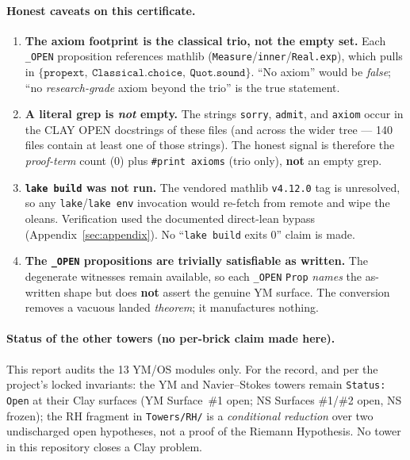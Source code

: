 \documentclass[11pt]{article}
\begin{document}
\paragraph{Honest caveats on this certificate.}
\begin{enumerate}
  \item \textbf{The axiom footprint is the classical trio, not the empty set.}
        Each \texttt{\_OPEN} proposition references mathlib
        (\texttt{Measure}/\texttt{inner}/\texttt{Real.exp}), which pulls in
        $\{\texttt{propext},\ \texttt{Classical.choice},\ \texttt{Quot.sound}\}$.
        ``No axiom'' would be \emph{false}; ``no \emph{research-grade} axiom
        beyond the trio'' is the true statement.
  \item \textbf{A literal grep is \emph{not} empty.} The strings
        \texttt{sorry}, \texttt{admit}, and \texttt{axiom} occur in the CLAY
        OPEN docstrings of these files (and across the wider tree --- 140 files
        contain at least one of those strings). The honest signal is therefore
        the \emph{proof-term} count (0) plus \texttt{\#print axioms} (trio only),
        \textbf{not} an empty grep.
  \item \textbf{\texttt{lake build} was not run.} The vendored mathlib
        \texttt{v4.12.0} tag is unresolved, so any \texttt{lake}/\texttt{lake env}
        invocation would re-fetch from remote and wipe the oleans. Verification
        used the documented direct-lean bypass (Appendix~\ref{sec:appendix}). No
        ``\texttt{lake build} exits 0'' claim is made.
  \item \textbf{The \texttt{\_OPEN} propositions are trivially satisfiable as
        written.} The degenerate witnesses remain available, so each
        \texttt{\_OPEN} \texttt{Prop} \emph{names} the as-written shape but does
        \textbf{not} assert the genuine YM surface. The conversion removes a
        vacuous landed \emph{theorem}; it manufactures nothing.
\end{enumerate}

\paragraph{Status of the other towers (no per-brick claim made here).}
This report audits the 13 YM/OS modules only. For the record, and per the
project's locked invariants: the YM and Navier--Stokes towers remain
\texttt{Status: Open} at their Clay surfaces (YM Surface~\#1 open; NS Surfaces
\#1/\#2 open, NS frozen); the RH fragment in \texttt{Towers/RH/} is a
\emph{conditional reduction} over two undischarged open hypotheses, not a proof
of the Riemann Hypothesis. No tower in this repository closes a Clay problem.
\clearpage
\end{document}

